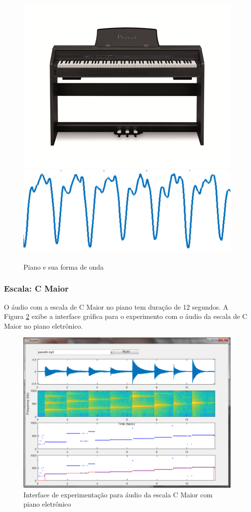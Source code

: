 \begin{figure} [h!]
	\centering
	\includegraphics[width=\linewidth/4]{pasta1_figuras/piano.png}
	\includegraphics[scale=0.8]{pasta1_figuras/piano-timbre.png}
	\caption{Piano e sua forma de onda}
	\label{fig-piano}
\end{figure}

\subsubsection{Escala: C Maior}

O áudio com a escala de C Maior no piano tem duração de 12 segundos. A Figura \ref{fig-piano-escala} exibe a interface gráfica para o experimento com o áudio da escala de C Maior no piano eletrônico.

\begin{figure}
	\centering
	\includegraphics[width=0.75\linewidth]{pasta1_figuras/piano-escala.png}
	\caption{Interface de experimentação para áudio da escala C Maior com piano eletrônico}
	\label{fig-piano-escala}
\end{figure}

